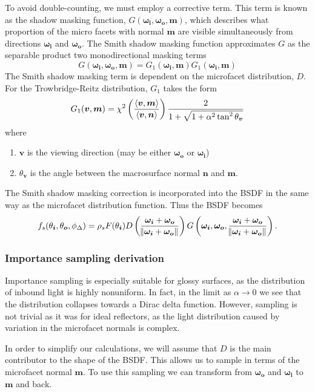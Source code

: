 \documentclass[12pt]{article}
\DeclarePairedDelimiter\ip{\langle }{\rangle}
\begin{document}
To avoid double-counting, we must employ a corrective term.
This term is known as the shadow masking function, \(G(\bm{\omega_i}, \bm{\omega_o}, \bm m)\), which describes what proportion of the micro facets with normal \(\bm m\) are visible simultaneously from directions \(\bm{\omega_i}\) and \(\bm{\omega_o}\).
The Smith shadow masking function approximates \(G\) as the separable product two monodirectional masking terms
\[G(\bm{\omega_i}, \bm{\omega_o}, \bm m) = G_1(\bm{\omega_i}, \bm m)G_1(\bm{\omega_i}, \bm m)\]
The Smith shadow masking term is dependent on the microfacet distribution, \(D\).
For the Trowbridge-Reitz distribution, \(G_1\) takes the form \autocite{hammon_2018}
\[G_1(\bm v, \bm m) = \chi^2\del{\frac{\ip{\bm v, \bm m}}{\ip{\bm v, \bm n}}} \frac{2}{1 + \sqrt{1 + \alpha^2 \tan^2{\theta_{\bm v}}}}\]
where
\begin{enumerate}
\item \(\bm v\) is the viewing direction (may be either \(\bm{\omega_o}\) or \(\bm{\omega_i}\))
\item \(\theta_{\bm v}\) is the angle between the macrosurface normal \(\bm n\) and \(\bm m\).
\end{enumerate}
The Smith shadow masking correction is incorporated into the BSDF in the same way as the microfacet distribution function.
Thus the BSDF becomes
\[f_s(\theta_{\bm i}, \theta_{\bm o}, \phi_\Delta) = \rho_sF(\theta_{\bm i})D\del{\frac{\bm{\omega_i} + \bm{\omega_o}}{\norm{\bm{\omega_i} + \bm{\omega_o}}}}G\del{\bm{\omega_i}, \bm{\omega_o}, \frac{\bm{\omega_i} + \bm{\omega_o}}{\norm{\bm{\omega_i} + \bm{\omega_o}}}}.\]

\subsubsection{Importance sampling derivation}

Importance sampling is especially suitable for glossy surfaces, as the distribution of inbound light is highly nonuniform.
In fact, in the limit as \(\alpha \to 0\) we see that the distribution collapses towards a Dirac delta function.
However, sampling is not trivial as it was for ideal reflectors, as the light distribution caused by variation in the microfacet normals is complex.

In order to simplify our calculations, we will assume that \(D\) is the main contributor to the shape of the BSDF.
This allows us to sample in terms of the microfacet normal \(\bm m\).
To use this sampling we can transform from \(\bm{\omega_o}\) and \(\bm{\omega_i}\) to \(\bm m\) and back.
\end{document}
